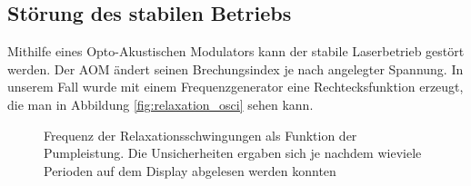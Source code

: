 \documentclass[11pt,twoside=true]{scrartcl}
\begin{document}
\subsection{Störung des stabilen Betriebs}
Mithilfe eines Opto-Akustischen Modulators kann der stabile Laserbetrieb gestört
werden. Der AOM ändert seinen Brechungsindex je nach angelegter Spannung. In unserem 
Fall wurde mit einem Frequenzgenerator eine Rechtecksfunktion erzeugt, die man
in Abbildung \ref{fig:relaxation_osci} sehen kann.
\begin{figure}[h!]
  \begin{floatrow}
     {
      \caption{Frequenz der Relaxationsschwingungen als Funktion der Pumpleistung. Die Unsicherheiten
      ergaben sich je nachdem wieviele Perioden auf dem Display abgelesen werden konnten}
    }
\end{floatrow}
\end{figure}
\end{document}

